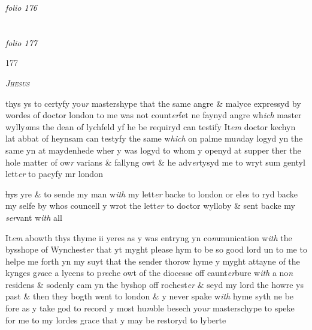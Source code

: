 \documentclass[12pt, a4paper]{book}
\begin{document}
\dotfill
						\newpage
{}

\textit{folio 176}


         \vspace*{4cm}
         
\dotfill
						  \section*{}

\textit{folio 177}



\begin{flushright}{\color{Mahogany}177}\end{flushright}
            		
				\begin{center} \begin{large} {\scshape \textit{Jhesus}} \end{large} \end{center}
			
            		
            			
		\ifthenelse{\isodd{\thepage}}
		{\reversemarginpar}
		{\normalmarginpar}
		thys ys to certyfy yo\textit{ur} mastershype that the same angre \& malyce expressyd by wordes of doctor london to me
			 was not count\textit{er}fet ne faynyd angre wh\textit{ich} master wylly\textit{a}ms the dean of lychfeld yf he be requiryd can testify It\textit{em} doctor kechyn lat abbat of heynsam can testyfy the same w\textit{hich} on palme mu\textit{n}day logyd yn the same yn 
			at maydenhede wher y was logyd to whom y openyd at supper ther the hole matter of ow\textit{r} varians \& fallyng owt \& he adv\textit{er}tysyd me to wryt sum gentyl lett\textit{er} to pacyfy mr london
			
            				\sout{hys }yre \& to sende my man w\textit{ith} my lett\textit{er} backe to london or el\textit{e}s to ryd backe my selfe by whos councell y wrot the lett\textit{er} to doctor wylloby \& sent backe my \textit{ser}vant w\textit{ith} all 
            			
		\ifthenelse{\isodd{\thepage}}
		{\reversemarginpar}
		{\normalmarginpar}
		It\textit{em} abowth thys thyme ii yeres as
			 y was entryng yn co\textit{m}munication w\textit{ith }the bysshope of Wynchest\textit{er} that yt myght please hym to be so good lord un to me to helpe me forth yn my suyt that  the sender thorow hyme y myght attayne of the kynges g\textit{ra}ce a lycens to p\textit{re}che owt of the diocesse off caunt\textit{er}bure w\textit{ith} a  no\textit{n} residens \& sodenly cam yn the byshop off rochest\textit{er} \& seyd  my lord the howre ys past \& then they bogth went to london \& y never spake w\textit{ith} hyme syth ne be fore as y take god to record y most hu\textit{m}ble besech yo\textit{ur} masterschype to speke for me to my lordes grace that y may be restoryd  to lyberte
            		
\end{document}
